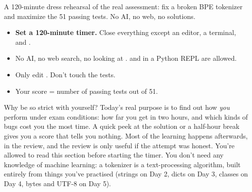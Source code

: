 \documentclass[10pt,a4paper]{article}
\begin{document}
\makecover
\setcounter{page}{2}
\makefrontmatter
\begin{goalbox}
A 120-minute dress rehearsal of the real assessment: fix a broken BPE tokenizer and maximize the 51 passing tests. No AI, no web, no solutions.
\end{goalbox}
\vspace{2pt}
\begin{itemize}
\item \textbf{Set a 120-minute timer.} Close everything except an editor, a terminal, and .
\item No AI, no web search, no looking at .  and  in a Python REPL are allowed.
\item Only edit . Don’t touch the tests.
\item Your score = number of passing tests out of 51.
\end{itemize}
Why be so strict with yourself? Today’s real purpose is to find out how \emph{you} perform under exam conditions: how far you get in two hours, and which kinds of bugs cost you the most time. A quick peek at the solution or a half-hour break gives you a score that tells you nothing. Most of the learning happens afterwards, in the review, and the review is only useful if the attempt was honest.
You’re allowed to read this section before starting the timer. You don’t need any knowledge of machine learning: a tokenizer is a text-processing algorithm, built entirely from things you’ve practised (strings on Day 2, dicts on Day 3, classes on Day 4, bytes and UTF-8 on Day 5).
\end{document}
